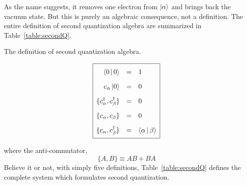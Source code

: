 %
As the name suggests, it removes one electron from $\Ket{\alpha}$ and
brings back the vacuum state. But this is purely an algebraic consequence,
not a definition.
The entire definition of second quantization
algebra are summarized in Table~\ref{table:secondQ}.
%
\begin{table}[h!]
\caption{The definition of second quantization algebra.}
\label{table:secondQ}
\begin{equation*}
\renewcommand\arraystretch{1.8}
\begin{array}{|>{\displaystyle}r >{\displaystyle}c >{\displaystyle}l|}
  \hline
  \Braket{0|0} & = & 1 \\
  c_\alpha\Ket{0} & = & 0 \\
  \{c_\alpha^\dagger, c_\beta^\dagger\} & = & 0 \\
  \{c_\alpha, c_\beta\} & = & 0 \\
  \{c_\alpha, c_\beta^\dagger\} & = & \Braket{\alpha|\beta} \\[0.2em]
  \hline
\end{array}
\end{equation*}
\end{table}

where the anti-commutator,
\begin{equation}
\{A,B\} \equiv AB + BA
\end{equation}
%
Believe it or not, with simply five definitions,
Table~\ref{table:secondQ} defines the complete system which formulates
second quantization.

